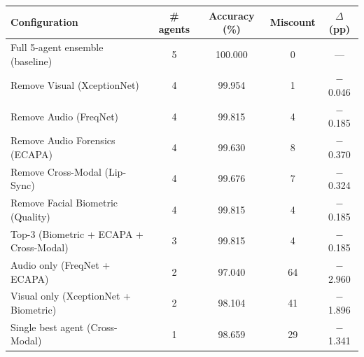 \begin{tabular}{lcccc}
\toprule
Configuration & \# agents & Accuracy (\%) & Miscount & $\Delta$ (pp) \\
\midrule
Full 5-agent ensemble (baseline) & 5 & 100.000 & 0 & --- \\
\midrule
Remove Visual (XceptionNet) & 4 & 99.954 & 1 & $-$0.046 \\
Remove Audio (FreqNet) & 4 & 99.815 & 4 & $-$0.185 \\
Remove Audio Forensics (ECAPA) & 4 & 99.630 & 8 & $-$0.370 \\
Remove Cross-Modal (Lip-Sync) & 4 & 99.676 & 7 & $-$0.324 \\
Remove Facial Biometric (Quality) & 4 & 99.815 & 4 & $-$0.185 \\
Top-3 (Biometric + ECAPA + Cross-Modal) & 3 & 99.815 & 4 & $-$0.185 \\
Audio only (FreqNet + ECAPA) & 2 & 97.040 & 64 & $-$2.960 \\
Visual only (XceptionNet + Biometric) & 2 & 98.104 & 41 & $-$1.896 \\
Single best agent (Cross-Modal) & 1 & 98.659 & 29 & $-$1.341 \\
\bottomrule
\end{tabular}
